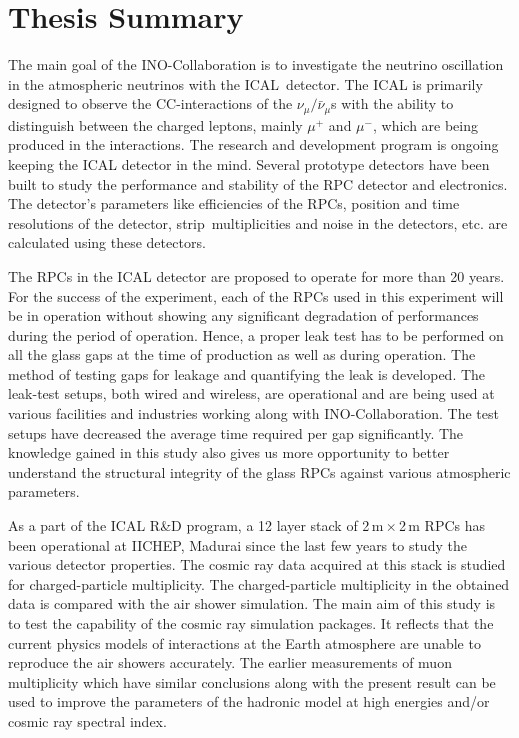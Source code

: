 
\chapter{Thesis Summary}

The main goal of the INO-Collaboration is to investigate the neutrino
oscillation in the atmospheric neutrinos with the ICAL~detector.
The ICAL is primarily designed to observe the CC-interactions of
the $\nu_{\mu}/\bar{\nu}_{\mu}$s with the ability to distinguish between
the charged leptons, mainly $\mu^{+}$ and $\mu^{-}$,
which are being produced in the interactions. The research and
development program is ongoing keeping the ICAL detector in the mind.
Several prototype detectors have been built to study the performance
and stability of the RPC detector and electronics. The detector's
parameters like efficiencies of the RPCs, position and time
resolutions of the detector, strip~multiplicities and noise
in the detectors, etc. are calculated using these detectors.

The RPCs in the ICAL detector are proposed to operate for more than 20
years. For the success of the experiment, each of the RPCs used in
this experiment will be in operation without showing any significant
degradation of performances during the period of operation. Hence, a
proper leak test has to be performed on all the glass gaps at the time
of production as well as during operation.
The method of testing gaps for leakage and quantifying the leak is
developed. The leak-test setups, both wired and wireless, are
operational and are being used at various facilities and industries
working along with INO-Collaboration. The test setups have decreased
the average time required per gap significantly. The knowledge gained
in this study also gives us more opportunity to better understand the
structural integrity of the glass RPCs against various atmospheric
parameters.

As a part of the ICAL R\&D program, a 12 layer stack of
2\,m\,$\times$\,2\,m RPCs has been operational at IICHEP, Madurai
since the last few years to study the various detector properties. The
cosmic ray data acquired at this stack is studied for charged-particle
multiplicity. The charged-particle multiplicity in the obtained data
is compared with the air shower simulation. The main aim of this study
is to test the capability of the cosmic ray simulation packages. It
reflects that the current physics models of interactions at the Earth
atmosphere are unable to reproduce the air showers accurately. The
earlier measurements of muon multiplicity which have similar
conclusions along with the present result can be used to improve the
parameters of the hadronic model at high energies and/or cosmic ray
spectral index.

